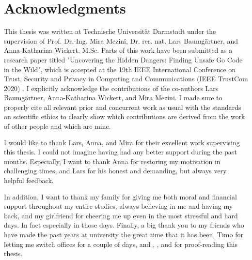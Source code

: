 \chapter*{Acknowledgments}

This thesis was written at Technische Universität Darmstadt under the supervision of Prof. Dr.-Ing. Mira Mezini,
Dr. rer. nat. Lars Baumgärtner, and Anna-Katharina Wickert, M.Sc.
Parts of this work have been submitted as a research paper titled "Uncovering the Hidden Dangers: Finding Unsafe Go Code
in the Wild", which is accepted at the 19th IEEE International Conference on Trust, Security and Privacy in
Computing and Communications (IEEE TrustCom 2020) .
I explicitly acknowledge the contributions of the co-authors Lars Baumgärtner, Anna-Katharina Wickert, and Mira Mezini.
I made sure to properly cite all relevant prior and concurrent work as usual with the standards on scientific ethics
to clearly show which contributions are derived from the work of other people and which are mine.

I would like to thank Lars, Anna, and Mira for their excellent work supervising this thesis.
I could not imagine having had any better support during the past months.
Especially, I want to thank Anna for restoring my motivation in challenging times, and Lars for his honest and
demanding, but always very helpful feedback.

In addition, I want to thank my family for giving me both moral and financial support throughout my entire studies,
always believing in me and having my back, and my girlfriend for cheering me up even in the most stressful and hard
days.
In fact especially in those days.
Finally, a big thank you to my friends who have made the past years at university the great time that it has been, Timo
for letting me switch offices for a couple of days, and , , and  for proof-reading this thesis.
